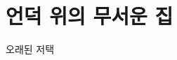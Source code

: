 \documentclass{report}
\begin{document}
	\section{언덕 위의 무서운 집}
	\begin{lite}{오래된 저택}
	\end{lite}
\end{document}
